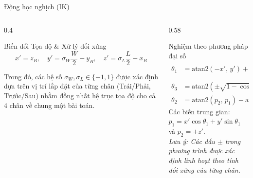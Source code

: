 \documentclass[10pt,aspectratio=169]{beamer}
\begin{document}
\begin{frame}{Động học nghịch (IK)}
  \begin{columns}[T]
      \begin{column}{0.4\textwidth}
          \begin{block}{Biến đổi Tọa độ \& Xử lý đối xứng}
              \vspace{-0.2cm}
              {\small
              \begin{equation*}
                  x' = z_B, \quad y' = \sigma_W \frac{W}{2} - y_B, \quad z' = \sigma_L \frac{L}{2} + x_B
              \end{equation*}
              }
          \end{block}
          \vspace{0.2cm}
          {\small
          Trong đó, các hệ số $\sigma_W, \sigma_L \in \{-1, 1\}$ được xác định dựa trên vị trí lắp đặt của từng chân (Trái/Phải, Trước/Sau) nhằm đồng nhất hệ trục tọa độ cho cả 4 chân về chung một bài toán.
          }
      \end{column}
      \begin{column}{0.58\textwidth}
          \begin{block}{Nghiệm theo phương pháp đại số}
              \vspace{-0.2cm}
              {\scriptsize
              \begin{align*}
                  \theta_1 &= \mathrm{atan2}(-x',\, y') + \mathrm{atan2}\left(-\sqrt{x'^2 + y'^2 - L_1^2},\; \pm L_1\right) \\
                  \theta_3 &= \mathrm{atan2}(\pm\sqrt{1 - \cos^2\theta_3},\, \cos\theta_3) \quad \text{với} \quad \cos\theta_3 = \frac{p_1^2 + p_2^2 - L_2^2 - L_3^2}{2 L_2 L_3} \\
                  \theta_2 &= \mathrm{atan2}(p_2,\, p_1) - \mathrm{atan2}(L_3 \sin\theta_3,\, L_2 + L_3 \cos\theta_3)
              \end{align*}
              }
              \vspace{0.1cm}
              {\footnotesize
              Các biến trung gian: $p_1 = x'\cos\theta_1 + y'\sin\theta_1$ và $p_2 = \pm z'$. \\
              \textit{Lưu ý: Các dấu $\pm$ trong phương trình được xác định linh hoạt theo tính đối xứng của từng chân.}
              }
              \vspace{0.1cm}
          \end{block}
      \end{column}
  \end{columns}
\end{frame}
\end{document}
